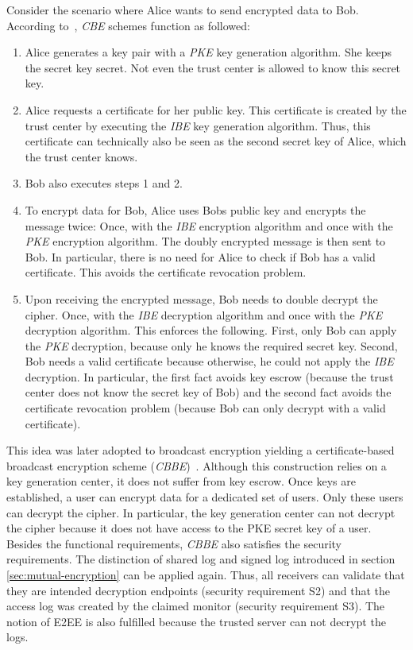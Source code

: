 \documentclass[../main.tex]{subfiles}
\begin{document}
Consider the scenario where Alice wants to send encrypted data to Bob. 
According to~\cite{Gentry2003}, \textit{CBE} schemes function as followed:

\begin{enumerate}
    \item Alice generates a key pair with a \textit{PKE} key generation algorithm. She keeps the secret key secret. 
    Not even the trust center is allowed to know this secret key.
    \item Alice requests a certificate for her public key. 
    This certificate is created by the trust center by executing the \textit{IBE} key generation algorithm. 
    Thus, this certificate can technically also be seen as the second secret key of Alice, which the trust center knows.
    \item Bob also executes steps 1 and 2.
    \item To encrypt data for Bob, Alice uses Bobs public key and encrypts the message twice: Once, with the \textit{IBE} encryption algorithm and once with the \textit{PKE} encryption algorithm. The doubly encrypted message is then sent to Bob. In particular, there is no need for Alice to check if Bob has a valid certificate. This avoids the certificate revocation problem.
    \item Upon receiving the encrypted message, Bob needs to double decrypt the cipher. 
    Once, with the \textit{IBE} decryption algorithm and once with the \textit{PKE} decryption algorithm. 
    This enforces the following.
    First, only Bob can apply the \textit{PKE} decryption, because only he knows the required secret key. 
    Second, Bob needs a valid certificate because otherwise, he could not apply the \textit{IBE} decryption. 
    In particular, the first fact avoids key escrow (because the trust center does not know the secret key of Bob) and the second fact avoids the certificate revocation problem (because Bob can only decrypt with a valid certificate).
\end{enumerate}
This idea was later adopted to broadcast encryption yielding a certificate-based broadcast encryption scheme (\textit{CBBE})~\cite{Li2018}.
Although this construction relies on a key generation center, it does not suffer from key escrow.
Once keys are established, a user can encrypt data for a dedicated set of users.
Only these users can decrypt the cipher.
In particular, the key generation center can not decrypt the cipher because it does not have access to the PKE secret key of a user.
Besides the functional requirements, \textit{CBBE} also satisfies the security requirements.
The distinction of shared log and signed log introduced in section \ref{sec:mutual-encryption} can be applied again.
Thus, all receivers can validate that they are intended decryption endpoints (security requirement S2) and that the access log was created by the claimed monitor (security requirement S3).
The notion of E2EE is also fulfilled because the trusted server can not decrypt the logs.
\end{document}
